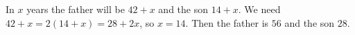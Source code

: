 In $x$ years the father will be $42+x$ and the son $14+x$. We need $42+x=2(14+x)=28+2x$, so $x=\boxed{14}$. Then the father is $56$ and the son $28$.
